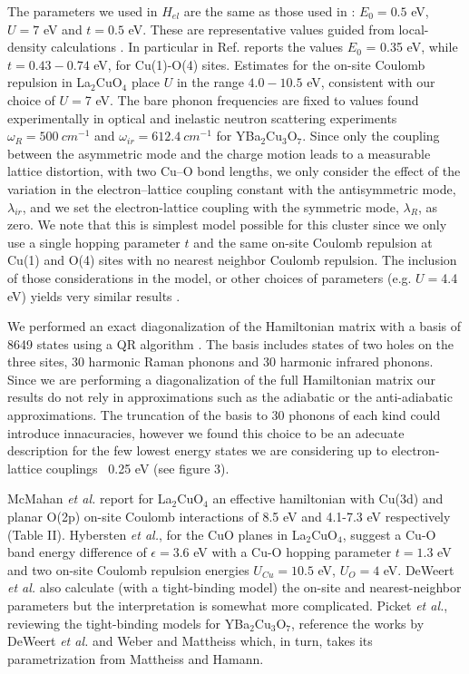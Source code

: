 The parameters we used in $H_{el}$  are the same as those used in \cite{Mena2006}: $E_0=0.5$ eV, $U=7$ eV and $t=0.5$ eV. These are representative values guided from local-density calculations \cite{Pickett1989}. In particular in Ref. \cite{DeWeert1989} reports the values $E_0$ = 0.35 eV, while $t=0.43-0.74$ eV, for Cu(1)-O(4) sites. Estimates for the on-site Coulomb repulsion in La$_2$CuO$_4$ place $U$ in the range $4.0-10.5$ eV, \cite{Hybertsen1989} consistent with our choice of $U=$7 eV.  The bare phonon frequencies are fixed to values found experimentally in optical and inelastic neutron scattering experiments $\omega_R = 500\ cm^{-1}$ and $\omega_{ir} = 612.4\ cm^{-1}$ for YBa$_2$Cu$_3$O$_7$. Since only the coupling between the asymmetric mode and the charge motion leads to a measurable lattice distortion, with two Cu–O bond lengths, we only consider the effect of the variation in the electron–lattice coupling constant with the antisymmetric mode, $\lambda_{ir}$,  and we set the electron-lattice coupling with the symmetric mode, $\lambda_R$, as zero. We note that this is simplest model possible for this cluster since we only use a single hopping parameter $t$ and the same on-site Coulomb repulsion at Cu(1) and O(4) sites with no nearest neighbor Coulomb repulsion. The inclusion of those considerations in the model, or other choices of parameters (e.g. $U = $4.4 eV) yields very similar results \cite{Salkola1994}.

We performed an exact diagonalization of the Hamiltonian matrix with a basis of 8649 states using a QR algorithm \cite{eigenweb}. The basis includes states of two holes on the three sites, 30 harmonic Raman phonons and 30 harmonic infrared phonons. Since we are performing a diagonalization of the full Hamiltonian matrix our results do not rely in approximations such as the adiabatic or the anti-adiabatic approximations. The  truncation of the basis to 30 phonons of each kind could introduce innacuracies, however we found this choice to be an adecuate description for the few lowest energy states we are considering up to electron-lattice couplings ~0.25 eV (see figure 3).

McMahan \textit{et al.}\cite{McMahan1988} report for La$_{2}$CuO$_{4}$ an effective hamiltonian with Cu(3d) and planar O(2p) on-site Coulomb interactions of 8.5 eV and 4.1-7.3 eV respectively (Table II). Hybersten \textit{et al.}\cite{Hybertsen1989}, for the CuO planes in La$_{2}$CuO$_{4}$, suggest a Cu-O band energy difference of $\epsilon = 3.6$ eV with a Cu-O hopping parameter $t = 1.3$ eV and two on-site Coulomb repulsion energies $U_{Cu} = 10.5$ eV, $U_O = 4$ eV. DeWeert \textit{et al.}\cite{DeWeert1989} also calculate (with a tight-binding model) the on-site and nearest-neighbor parameters but the interpretation is somewhat more complicated. Picket \textit{et al.}\cite{Pickett1989}, reviewing the tight-binding models for YBa$_{2}$Cu$_{3}$O$_{7}$, reference the works by DeWeert \textit{et al.}\cite{DeWeert1989} and Weber and Mattheiss\cite{Weber1988} which, in turn, takes its parametrization from Mattheiss and Hamann\cite{Mattheiss1987}.

